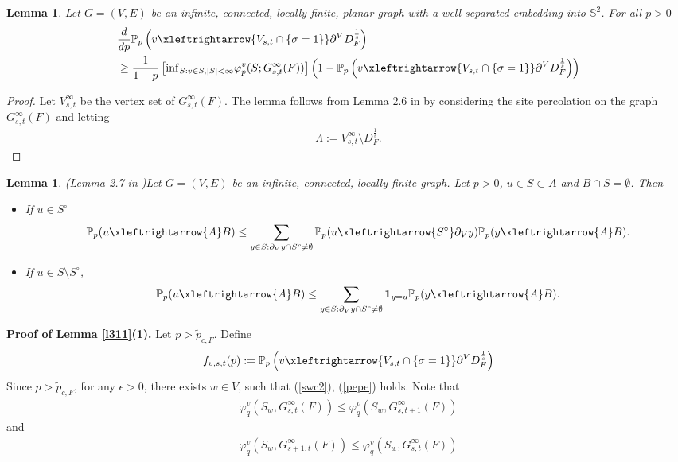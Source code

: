 \documentclass[11pt]{amsart}
\theoremstyle{plain}
\newtheorem{lemma}[theorem]{Lemma}
\numberwithin{equation}{section}
\numberwithin{figure}{section}
\begin{document}
\begin{lemma}\label{l312}Let $G=(V,E)$ be an infinite, connected, locally finite, planar graph with a well-separated embedding into $\mathbb{S}^2$. For all $p>0$ 
\begin{align*}
&\frac{d}{dp}\mathbb{P}_p\left(v\xleftrightarrow{V_{s,t}\cap\{\sigma=1\}} \partial^V D_{F}^{\frac{1}{s}}\right)\\
&\geq \frac{1}{1-p}
\left[ \mathrm{inf}_{S:v\in S,|S|<\infty}\varphi_p^v(S;G_{s,t}^{\infty}(F))\right]
\left(1-\mathbb{P}_p\left(v\xleftrightarrow{V_{s,t}\cap\{\sigma=1\}} \partial^V D_{F}^{\frac{1}{s}}\right)\right)
\end{align*}
\end{lemma}

\begin{proof}Let $V_{s,t}^{\infty}$ be the vertex set of $G_{s,t}^{\infty}(F)$.
The lemma follows from Lemma 2.6 in \cite{ZL24} by considering the site percolation on the graph $G_{s,t}^{\infty}(F)$ and letting 
\begin{align*}
\Lambda:=V_{s,t}^{\infty}\setminus D_F^{\frac{1}{s}}.
\end{align*}
\end{proof}

\begin{lemma}(Lemma 2.7 in \cite{ZL24})\label{l73}Let $G=(V,E)$ be an infinite, connected, locally finite graph. Let $p>0$, $u\in S\subset A$ and $B\cap S=\emptyset$. Then
\begin{itemize}
\item If $u\in S^{\circ}$
\begin{align*}
    \mathbb{P}_p(u\xleftrightarrow{A} B)\leq \sum_{y\in S:\partial_V y\cap S^c\neq \emptyset}
    \mathbb{P}_p(u\xleftrightarrow{S^{\circ}}\partial_V y )\mathbb{P}_p(y\xleftrightarrow{A} B).
\end{align*}
\item If $u\in S\setminus S^{\circ}$,
\begin{align*}
    \mathbb{P}_p(u\xleftrightarrow{A} B)\leq \sum_{y\in S:\partial_V y\cap S^c\neq \emptyset}
    \mathbf{1}_{y=u}\mathbb{P}_p(y\xleftrightarrow{A} B).
\end{align*}
\end{itemize}
\end{lemma}



\bigskip
\noindent\textbf{Proof of Lemma \ref{l311}(1).}
Let $p>\tilde{p}_{c,F}$. Define
\begin{align}
f_{v,s,t}(p):=\mathbb{P}_p\left(v\xleftrightarrow{V_{s,t}\cap\{\sigma=1\}} \partial^V D_{F}^{\frac{1}{s}}\right)\label{dfv}
\end{align}
Since $p>\tilde{p}_{c,F}$, for any $\epsilon>0$, there exists $w\in V$, such that (\ref{swc2}), (\ref{pepe}) holds. Note that
\begin{align}
\varphi_q^v(S_w,G_{s,t}^{\infty}(F))\leq \varphi_q^v(S_w,G_{s,t+1}^{\infty}(F))\label{tis}
\end{align}
and
\begin{align*}
\varphi_q^v(S_w,G_{s+1,t}^{\infty}(F))\leq \varphi_q^v(S_w,G_{s,t}^{\infty}(F))
\end{align*}
\end{document}
